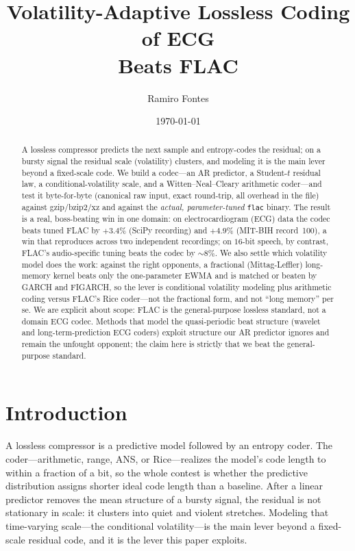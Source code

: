 \documentclass[11pt,reqno]{amsart}
\title[Volatility-adaptive lossless coding of ECG beats FLAC]{Volatility-Adaptive Lossless Coding of ECG\\
  Beats FLAC}
\author{Ramiro Fontes}
\date{\today}
\theoremstyle{plain}
\theoremstyle{remark}
\begin{document}
\begin{abstract}
A lossless compressor predicts the next sample and entropy-codes the residual;
on a bursty signal the residual scale (volatility) clusters, and modeling it is
the main lever beyond a fixed-scale code. We build a codec---an AR predictor, a
Student-$t$ residual law, a conditional-volatility scale, and a Witten--Neal--Cleary
arithmetic coder---and test it byte-for-byte (canonical raw input, exact
round-trip, all overhead in the file) against gzip/bzip2/xz and against the
\emph{actual, parameter-tuned} \texttt{flac} binary. The result is a real,
boss-beating win in one domain: on electrocardiogram (ECG) data the codec beats
tuned FLAC by $+3.4\%$ (SciPy recording) and $+4.9\%$ (MIT-BIH record~100), a
win that reproduces across two independent recordings; on $16$-bit speech, by
contrast, FLAC's audio-specific tuning beats the codec by $\sim 8\%$. We also
settle which volatility model does the work: against the right opponents, a
fractional (Mittag-Leffler) long-memory kernel beats only the one-parameter
EWMA and is matched or beaten by GARCH and FIGARCH, so the lever is conditional
volatility modeling plus arithmetic coding versus FLAC's Rice coder---not the
fractional form, and not ``long memory'' per se. We are explicit about scope:
FLAC is the general-purpose lossless standard, not a domain ECG codec. Methods
that model the quasi-periodic beat structure (wavelet and long-term-prediction
ECG coders) exploit structure our AR predictor ignores and remain the unfought
opponent; the claim here is strictly that we beat the general-purpose standard.
\end{abstract}

\maketitle

\section{Introduction}
\label{sec:intro}

A lossless compressor is a predictive model followed by an entropy coder. The
coder---arithmetic, range, ANS, or Rice---realizes the model's code length to
within a fraction of a bit, so the whole contest is whether the predictive
distribution assigns shorter ideal code length than a baseline. After a linear
predictor removes the mean structure of a bursty signal, the residual is not
stationary in scale: it clusters into quiet and violent stretches. Modeling that
time-varying scale---the conditional volatility---is the main lever beyond a
fixed-scale residual code, and it is the lever this paper exploits.
\end{document}
